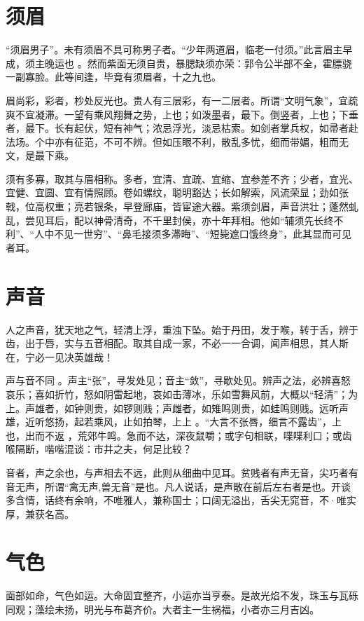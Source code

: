 \documentclass[12pt,UTF8]{ctexbook}
\begin{document}
\chapter{须眉}

“须眉男子”。未有须眉不具可称男子者。“少年两道眉，临老一付须。”此言眉主早成，须主晚运也 。然而紫面无须自贵，暴腮缺须亦荣：郭令公半部不全，霍膘骁一副寡脸。此等间逢，毕竟有须眉者，十之九也。 

眉尚彩，彩者，杪处反光也。贵人有三层彩，有一二层者。所谓“文明气象”，宜疏爽不宜凝滞。一望有乘风翔舞之势，上也；如泼墨者，最下。倒竖者，上也；下垂者，最下。长有起伏，短有神气；浓忌浮光，淡忌枯索。如剑者掌兵权，如帚者赴法场。个中亦有征范，不可不辨。但如压眼不利，散乱多忧，细而带媚，粗而无文，是最下乘。 

须有多寡，取其与眉相称。多者，宜清、宜疏、宜缩、宜参差不齐；少者，宜光、宜健、宜圆、宜有情照顾。卷如螺纹，聪明豁达；长如解索，风流荣显；劲如张戟，位高权重；亮若银条，早登廊庙，皆宦途大器。紫须剑眉，声音洪壮；蓬然虬乱，尝见耳后，配以神骨清奇，不千里封侯，亦十年拜相。他如“辅须先长终不利”、“人中不见一世穷”、“鼻毛接须多滞晦”、“短毙遮口饿终身”，此其显而可见者耳。

\chapter{声音}

人之声音，犹天地之气，轻清上浮，重浊下坠。始于丹田，发于喉，转于舌，辨于齿，出于唇，实与五音相配。取其自成一家，不必一一合调，闻声相思，其人斯在，宁必一见决英雄哉！ 

声与音不同 。声主“张”，寻发处见；音主“敛”，寻歇处见。辨声之法，必辨喜怒哀乐；喜如折竹，怒如阴雷起地，哀如击薄冰，乐如雪舞风前，大概以“轻清”；为上。声雄者，如钟则贵，如锣则贱；声雌者，如雉鸣则贵，如蛙鸣则贱。远听声雄，近听悠扬，起若乘风，止如拍琴，上上 。“大言不张唇，细言不露齿”，上也，出而不返 ，荒郊牛鸣。急而不达，深夜鼠嚼；或字句相联，喋喋利口；或齿喉隔断，喈喈混谈：市井之夫，何足比较？ 

音者，声之余也，与声相去不远，此则从细曲中见耳。贫贱者有声无音，尖巧者有音无声，所谓“禽无声,兽无音”是也。凡人说话，是声散在前后左右者是也。开谈多含情，话终有余响，不唯雅人，兼称国士；口阔无溢出，舌尖无窕音，不·唯实厚，兼获名高。 

\chapter{气色}

面部如命，气色如运。大命固宜整齐，小运亦当亨泰。是故光焰不发，珠玉与瓦砾同观；藻绘未扬，明光与布葛齐价。大者主一生祸福，小者亦三月吉凶。 
\end{document}
